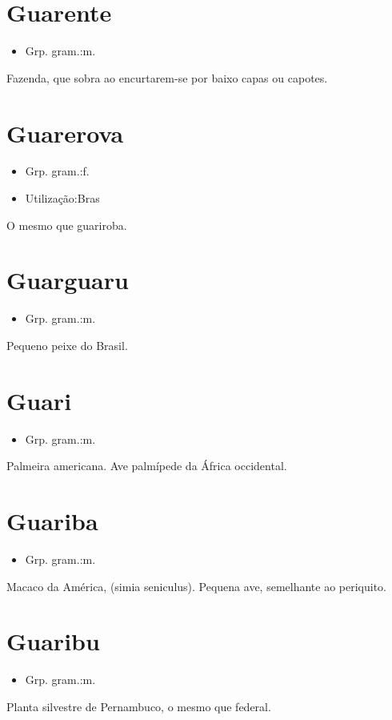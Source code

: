 \section{Guarente}
\begin{itemize}
\item {Grp. gram.:m.}
\end{itemize}
Fazenda, que sobra ao encurtarem-se por baixo capas ou capotes.
\section{Guarerova}
\begin{itemize}
\item {Grp. gram.:f.}
\end{itemize}
\begin{itemize}
\item {Utilização:Bras}
\end{itemize}
O mesmo que \textunderscore guariroba\textunderscore .
\section{Guarguaru}
\begin{itemize}
\item {Grp. gram.:m.}
\end{itemize}
Pequeno peixe do Brasil.
\section{Guari}
\begin{itemize}
\item {Grp. gram.:m.}
\end{itemize}
Palmeira americana.
Ave palmípede da África occidental.
\section{Guariba}
\begin{itemize}
\item {Grp. gram.:m.}
\end{itemize}
Macaco da América, (\textunderscore simia seniculus\textunderscore ).
Pequena ave, semelhante ao periquito.
\section{Guaribu}
\begin{itemize}
\item {Grp. gram.:m.}
\end{itemize}
Planta silvestre de Pernambuco, o mesmo que \textunderscore federal\textunderscore .
